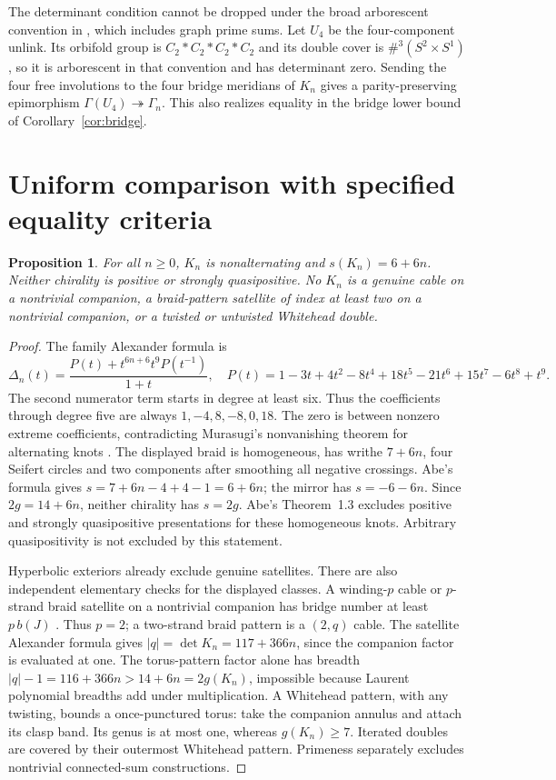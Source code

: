 \documentclass[11pt]{article}
\newtheorem{proposition}[theorem]{Proposition}
\begin{document}
The determinant condition cannot be dropped under the broad
arborescent convention in \cite{bkn}, which includes graph prime
sums. Let $U_4$ be the four-component unlink. Its orbifold group is
$C_2*C_2*C_2*C_2$ and its double cover is
$\#^3(S^2\times S^1)$, so it is arborescent in that convention and
has determinant zero. Sending the four free involutions to the
four bridge meridians of $K_n$ gives a parity-preserving epimorphism
$\Gamma(U_4)\twoheadrightarrow\Gamma_n$. This also realizes equality
in the bridge lower bound of Corollary~\ref{cor:bridge}.

\section{Uniform comparison with specified equality criteria}

\begin{proposition}\label{prop:elementary}
For all $n\ge0$, $K_n$ is nonalternating and
$s(K_n)=6+6n$. Neither chirality is positive or strongly quasipositive.
No $K_n$ is a genuine cable on a nontrivial companion, a braid-pattern satellite of index at least two on a nontrivial companion, or a twisted or untwisted Whitehead double.
\end{proposition}
\begin{proof}
The family Alexander formula is
\[
 \Delta_n(t)=\frac{P(t)+t^{6n+6}t^9P(t^{-1})}{1+t},\quad
 P(t)=1-3t+4t^2-8t^4+18t^5-21t^6+15t^7-6t^8+t^9.
\]
The second numerator term starts in degree at least six.
Thus the coefficients through degree five are always
$1,-4,8,-8,0,18$. The zero is between nonzero extreme coefficients,
contradicting Murasugi's nonvanishing theorem for alternating knots
\cite[Theorem~1.1]{murasugi}.
The displayed braid is homogeneous, has writhe $7+6n$, four Seifert
circles and two components after smoothing all negative crossings.
Abe's formula \cite[Theorem~1.2]{abe} gives
$s=7+6n-4+4-1=6+6n$; the mirror has $s=-6-6n$.
Since $2g=14+6n$, neither chirality has $s=2g$.
Abe's Theorem~1.3 excludes positive and strongly quasipositive
presentations for these homogeneous knots. Arbitrary quasipositivity
is not excluded by this statement.

Hyperbolic exteriors already exclude genuine satellites.
There are also independent elementary checks for the displayed
classes. A winding-$p$ cable or $p$-strand braid satellite on a
nontrivial companion has bridge number at least $p\,b(J)$
\cite[Theorem~1]{schultens}. Thus $p=2$; a two-strand braid pattern
is a $(2,q)$ cable. The satellite Alexander formula
\cite[Theorem~2 and Seifert corollary]{lm} gives
$|q|=\det K_n=117+366n$, since the companion factor is evaluated
at one. The torus-pattern factor alone has breadth
$|q|-1=116+366n>14+6n=2g(K_n)$, impossible because Laurent
polynomial breadths add under multiplication. A Whitehead pattern,
with any twisting, bounds a once-punctured torus: take the companion
annulus and attach its clasp band. Its genus is at most one,
whereas $g(K_n)\ge7$. Iterated doubles are covered by their outermost
Whitehead pattern. Primeness separately excludes nontrivial
connected-sum constructions.
\end{proof}
\end{document}
